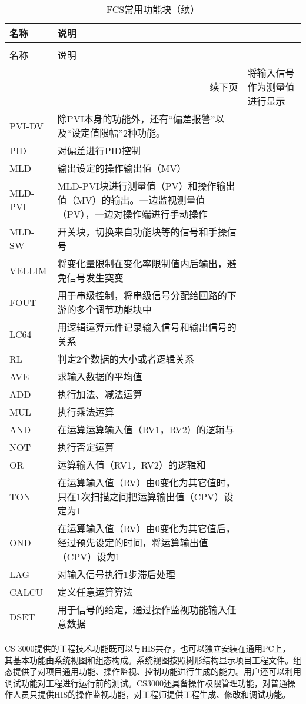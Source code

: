 \begingroup
\renewcommand*{\arraystretch}{1.67}
\begin{small}
\begin{longtable}[!h]{l|p{11cm}}
\caption[FCS常用控制块]{FCS常用控制块} \label{tab:fcs_blocks}\\

\toprule[0.5pt]
\hline
名称  & 说明 \\
\midrule
\endfirsthead
\caption[FCS常用控制块（续）]{FCS常用功能块（续）} \\
\toprule[0.5pt]
\hline
名称  & 说明 \\
\midrule
\endhead
\hline
\multicolumn{2}{r}{\small 续下页}
\endfoot
\hline
\bottomrule[0.5pt]
\endlastfoot

PVI &   将输入信号作为测量值进行显示\\
PVI-DV  &   除PVI本身的功能外，还有“偏差报警”以及“设定值限幅”2种功能。\\
PID &   对偏差进行PID控制\\
MLD&输出设定的操作输出值（MV）\\
MLD-PVI&MLD-PVI块进行测量值（PV）和操作输出值（MV）的输出。一边监视测量值（PV），一边对操作端进行手动操作\\
MLD-SW&开关块，切换来自功能块等的信号和手操信号\\
VELLIM&将变化量限制在变化率限制值内后输出，避免信号发生突变\\
FOUT&用于串级控制，将串级信号分配给回路的下游的多个调节功能块中\\
LC64&用逻辑运算元件记录输入信号和输出信号的关系\\
RL&判定2个数据的大小或者逻辑关系\\
AVE&求输入数据的平均值\\
ADD&执行加法、减法运算\\
MUL&执行乘法运算\\
AND&在运算运算输入值（RV1，RV2）的逻辑与\\
NOT&执行否定运算\\
OR&运算输入值（RV1，RV2）的逻辑和\\
TON&在运算输入值（RV）由0变化为其它值时，只在1次扫描之间把运算输出值（CPV）设定为1\\
OND&在运算输入值（RV）由0变化为其它值后，经过预先设定的时间，将运算输出值（CPV）设为1\\
LAG&对输入信号执行1步滞后处理\\
CALCU&定义任意运算算法\\
DSET&用于信号的给定，通过操作监视功能输入任意数据\\
\end{longtable}
\end{small}
\endgroup
CS 3000提供的工程技术功能既可以与HIS共存，也可以独立安装在通用PC上， 其基本功能由系统视图和组态构成。系统视图按照树形结构显示项目工程文件。组态提供了对项目通用功能、操作监视、控制功能进行生成的能力。用户还可以利用调试功能对工程进行运行前的测试。CS3000还具备操作权限管理功能，对普通操作人员只提供HIS的操作监视功能，对工程师提供工程生成、修改和调试功能。

